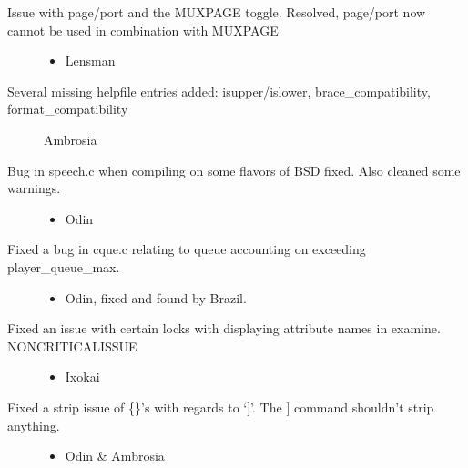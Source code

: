 \documentclass[letterpaper,10pt,english]{sphinxmanual}
\begin{document}
\begin{description}
\item[{Issue with page/port and the MUXPAGE toggle. Resolved, page/port now cannot be used in combination with MUXPAGE}] \leavevmode\begin{itemize}
\item {} 
\sphinxAtStartPar
Lensman

\end{itemize}

\item[{Several missing helpfile entries added: isupper/islower, brace\_compatibility, format\_compatibility}] \leavevmode
\sphinxAtStartPar
\sphinxhyphen{}Ambrosia

\item[{Bug in speech.c when compiling on some flavors of BSD fixed. Also cleaned some warnings.}] \leavevmode\begin{itemize}
\item {} 
\sphinxAtStartPar
Odin

\end{itemize}

\item[{Fixed a bug in cque.c relating to queue accounting on exceeding player\_queue\_max.}] \leavevmode\begin{itemize}
\item {} 
\sphinxAtStartPar
Odin, fixed and found by Brazil.

\end{itemize}

\item[{Fixed an issue with certain locks with displaying attribute names in examine. NON\sphinxhyphen{}CRITICAL\sphinxhyphen{}ISSUE}] \leavevmode\begin{itemize}
\item {} 
\sphinxAtStartPar
Ixokai

\end{itemize}

\item[{Fixed a strip issue of \{\}’s with regards to ‘{]}’.  The {]} command shouldn’t strip anything.}] \leavevmode\begin{itemize}
\item {} 
\sphinxAtStartPar
Odin \& Ambrosia

\end{itemize}

\end{description}
\end{document}
